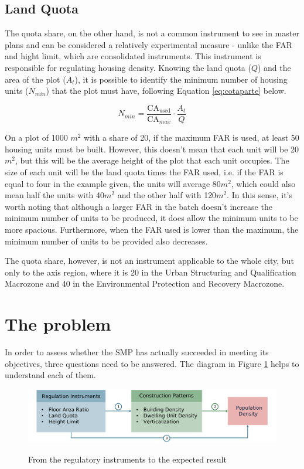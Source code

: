 \subsection*{Land Quota}

The quota share, on the other hand, is not a common instrument to see in master plans and can be considered a relatively experimental measure - unlike the FAR and hight limit, which are consolidated instruments. This instrument is responsible for regulating housing density. Knowing the land quota ($Q$) and the area of the plot ($A_t$), it is possible to identify the minimum number of housing units ($N_{min}$) that the plot must have, following Equation \ref{eq:cotaparte} below.

\begin{equation}
    N_{min} = \frac{\text{CA}_{\text{used}}}{\text{CA}_{max}}\cdot \frac{A_t}{Q}
    \label{eq:cotaparte}
\end{equation}


On a plot of 1000 $m^2$ with a share of 20, if the maximum FAR is used, at least 50 housing units must be built. However, this doesn't mean that each unit will be 20$m^2$, but this will be the average height of the plot that each unit occupies. The size of each unit will be the land quota times the FAR used, i.e. if the FAR is equal to four in the example given, the units will average 80$m^2$, which could also mean half the units with 40$m^2$ and the other half with 120$m^2$. In this sense, it's worth noting that although a larger FAR in the batch doesn't increase the minimum number of units to be produced, it does allow the minimum units to be more spacious. Furthermore, when the FAR used is lower than the maximum, the minimum number of units to be provided also decreases.

The quota share, however, is not an instrument applicable to the whole city, but only to the axis region, where it is 20 in the Urban Structuring and Qualification Macrozone and 40 in the Environmental Protection and Recovery Macrozone.

\section{The problem}
\label{sec:problem}

In order to assess whether the SMP has actually succeeded in meeting its objectives, three questions need to be answered. The diagram in Figure \ref{fig:diagram} helps to understand each of them.

\begin{figure}[h]
    \caption{From the regulatory instruments to the expected result}
    \includegraphics[width = \linewidth]{figuras/desenho_proposta.pdf}
    \label{fig:diagram}
\end{figure}

